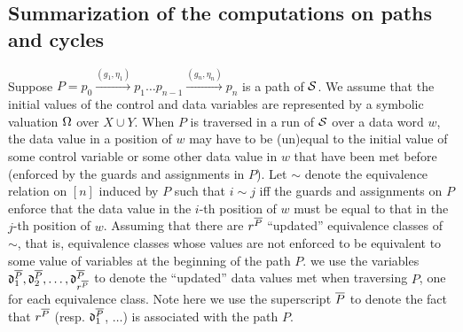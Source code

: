 \vspace{-4mm}
\subsection{Summarization of the computations on paths and cycles}\label{sec-sum}
\vspace{-1mm}

Suppose $P=p_0 \xrightarrow{(g_1,\eta_1)} p_1 \dots p_{n-1} \xrightarrow{(g_n,\eta_n)} p_{n}$ is a path of ${\mathcal{S} }$. We assume that the initial values of the control and data variables are represented by a symbolic valuation $\Omega$ over $X \cup Y$. When $P$ is traversed in a run of ${\mathcal{S} }$ over a data word $w$,  the data value in a position of $w$ may have to be (un)equal to the initial value of some control variable or some other data value in $w$ that have been met before (enforced by the guards and assignments in $P$). Let $\sim$ denote the equivalence relation on $[n]$ induced by $P$ such that $i \sim j$ iff the guards and assignments on $P$ enforce that the data value in the $i$-th position of $w$ must be equal to that in the $j$-th position of $w$. Assuming that there are $r^{\overline{P}}$ ``updated'' equivalence classes of $\sim$, that is, equivalence classes whose values are not enforced to be equivalent to some value of variables
at the beginning of the path $P$. 
we use the variables $\mathfrak{d}^{\overline{P}}_1,\mathfrak{d}^{\overline{P}}_2,\dots, \mathfrak{d}^{\overline{P}}_{r^{\overline{P}}}$ to denote the ``updated'' data values met when traversing $P$, one for each equivalence class. Note here we use the superscript ${\overline{P}}$ to denote the fact that $r^{\overline{P}}$ (resp. $\mathfrak{d}^{\overline{P}}_1$, $\dots$) is associated with the path $P$.

